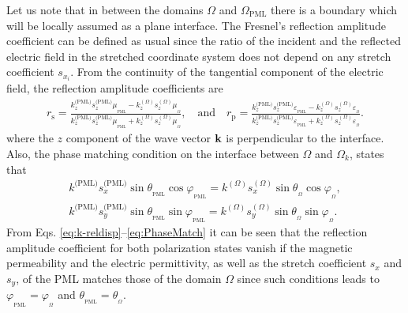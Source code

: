     Let us note that in between the domains $\Omega$ and $\Omega_\text{PML}$ there is a boundary which will be  locally assumed as a plane interface. The Fresnel's reflection amplitude  coefficient can be defined as usual since the ratio of the incident and the reflected electric field in the stretched coordinate system does not depend on any stretch coefficient $s_{x_i}$. From the continuity of the tangential component of the electric field, the reflection amplitude coefficients are
    \begin{align}
       r_\text{s} = \frac{k^\text{(PML)}_z s^\text{(PML)}_z\mu_{{}_\text{PML}} - k^{(\Omega)}_z s^{(\Omega)}_z\mu_{{}_\Omega}}
                        {k^\text{(PML)}_z s^\text{(PML)}_z\mu_{{}_\text{PML}} + k^{(\Omega)}_z s^{(\Omega)}_z\mu_{{}_\Omega}},
           \quad
           \text{and}
           \quad
       r_\text{p} = \frac{k^\text{(PML)}_z s^\text{(PML)}_z\varepsilon_{{}_\text{PML}} - k^{(\Omega)}_z s^{(\Omega)}_z\varepsilon_{{}_\Omega}}
                        {k^\text{(PML)}_z s^\text{(PML)}_z\varepsilon_{{}_\text{PML}} + k^{(\Omega)}_z s^{(\Omega)}_z\varepsilon_{{}_\Omega}}.
       \label{eq:refl-Fresnel}
    \end{align}
   where the $z$ component of the wave vector $\vb{k}$ is perpendicular to the interface.   Also, the phase matching condition on the interface between $\Omega$ and $\Omega_k$, states that
   \begin{subequations}
       \label{eq:PhaseMatch}
    \begin{align}
       k^\text{(PML)} s^\text{(PML)}_x \sin\theta_{{}_\text{PML}}\cos\varphi_{{}_\text{PML}} =
                        k^{(\Omega)} s^{(\Omega)}_x \sin\theta_{{}_\Omega}\cos\varphi_{{}_\Omega},\\
        k^\text{(PML)} s^\text{(PML)}_y \sin\theta_{{}_\text{PML}}\sin\varphi_{{}_\text{PML}} =
                     k^{(\Omega)} s^{(\Omega)}_y \sin\theta_{{}_\Omega}\sin\varphi_{{}_\Omega}.
    \end{align}
    \end{subequations}
    \noindent
   From Eqs. \eqref{eq:k-reldisp}--\eqref{eq:PhaseMatch} it can be seen that the reflection amplitude coefficient for both polarization states vanish if the magnetic permeability and the electric permittivity, as well as the stretch coefficient $s_x$ and $s_y$, of the PML matches those of the domain $\Omega$ since such conditions leads to  $\varphi_{{}_\text{PML}} = \varphi_{{}_\Omega}$ and  $\theta_{{}_\text{PML}} = \theta_{{}_\Omega}$.

